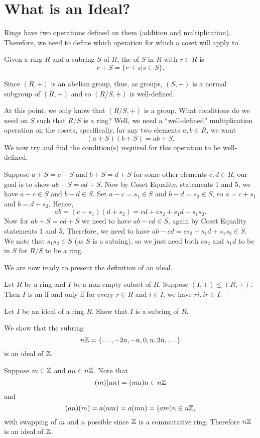 \newpage

\section{What is an Ideal?}
Rings have two operations defined on them (addition and multiplication). Therefore, we need to define which operation for which a coset will apply to.
\begin{definition}
    Given a ring $R$ and a subring $S$ of $R$, the  of $S$ in $R$ with  $r \in R$ is
    \[
        r + S = \{r+s \vert s \in S\}.
    \]
\end{definition}
\begin{remark}
    Since $(R,+)$ is an abelian group, thus, as groups, $(S,+)$ is a normal subgroup of $(R,+)$ and so $(R/S,+)$ is well-defined.
\end{remark}

At this point, we only know that $(R/S,+)$ is a group. What conditions do we need on $S$ such that $R/S$ is a ring? Well, we need a ``well-defined'' multiplication operation on the cosets, specifically, for any two elements $a, b \in R$, we want
\[
    (a+S)(b+S) = ab + S.
\]
We now try and find the condition(s) required for this operation to be well-defined.

Suppose $a+S = c+S$ and $b+S = d+S$ for some other elements $c, d \in R$; our goal is to show $ab+S = cd+S$. Now by Coset Equality, statements 1 and 5, we have $a-c \in S$ and $b-d \in S$. Set $a-c = s_1 \in S$ and $b-d = s_2 \in S$, so $a = c+s_1$ and $b = d+s_2$. Hence,
\[
    ab = (c+s_1)(d+s_2) = cd + cs_2 + s_1d + s_1s_2.
\]
Now for $ab + S = cd+S$ we need to have $ab-cd \in S$, again by Coset Equality statements 1 and 5. Therefore, we need to have $ab-cd = cs_2+s_1d+s_1s_2 \in S$. We note that $s_1s_2 \in S$ (as $S$ is a subring), so we just need both $cs_2$ and $s_1d$ to be in $S$ for $R/S$ to be a ring.

We are now ready to present the definition of an ideal.
\begin{definition}
    Let $R$ be a ring and $I$ be a non-empty subset of $R$. Suppose $(I,+) \leq (R,+)$. Then $I$ is an  if and only if for every $r \in R$ and $i \in I$, we have $ri, ir \in I$.
\end{definition}
\begin{exercise}\label{exercise-ideal-is-a-subring}
    Let $I$ be an ideal of a ring $R$. Show that $I$ is a subring of $R$.
\end{exercise}
\begin{example}\label{example-nZ-ideal-of-Z}
    We show that the subring
    \[
        n\mathbb{Z} = \{\dots, -2n, -n, 0, n, 2n, \dots\}
    \]
    is an ideal of $\mathbb{Z}$.

    Suppose $m \in \mathbb{Z}$ and $an \in n\mathbb{Z}$.  Note that
    \[
        (m)(an) = (ma)n \in n\mathbb{Z}
    \]
    and
    \[
        (an)(m) = a(nm) = a(mn) = (am)n \in n\mathbb{Z},
    \]
    with swapping of $m$ and $n$ possible since $\mathbb{Z}$ is a commutative ring. Therefore $n\mathbb{Z}$ is an ideal of $\mathbb{Z}$.
\end{example}

